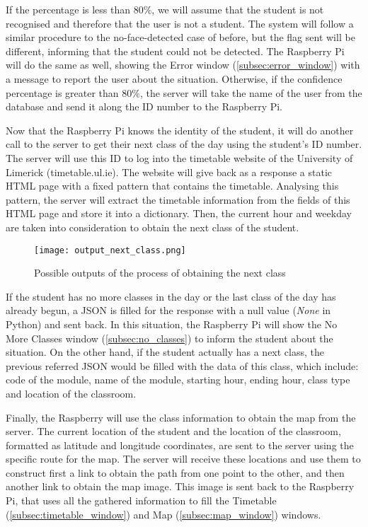 	If the percentage is less than 80\%, we will assume that the student is not recognised and therefore that the user is not a student. The system will follow a similar procedure to the no-face-detected case of before, but the flag sent will be different, informing that the student could not be detected. The Raspberry Pi will do the same as well, showing the Error window (\ref{subsec:error_window}) with a message to report the user about the situation. Otherwise, if the confidence percentage is greater than 80\%, the server will take the name of the user from the database and send it along the ID number to the Raspberry Pi.

	Now that the Raspberry Pi knows the identity of the student, it will do another call to the server to get their next class of the day using the student's ID number. The server will use this ID to log into the timetable website of the University of Limerick (timetable.ul.ie). The website will give back as a response a static HTML page with a fixed pattern that contains the timetable. Analysing this pattern, the server will extract the timetable information from the fields of this HTML page and store it into a dictionary. Then, the current hour and weekday are taken into consideration to obtain the next class of the student.   

	\begin{figure}[!ht]
		\centering
		\texttt{[image: output\_next\_class.png]}
		\caption{Possible outputs of the process of obtaining the next class}
		\label{fig:output_next_class}
	\end{figure}

	If the student has no more classes in the day or the last class of the day has already begun, a JSON is filled for the response with a null value (\textit{None} in Python) and sent back. In this situation, the Raspberry Pi will show the No More Classes window (\ref{subsec:no_classes}) to inform the student about the situation. On the other hand, if the student actually has a next class, the previous referred JSON would be filled with the data of this class, which include: code of the module, name of the module, starting hour, ending hour, class type and location of the classroom.

	Finally, the Raspberry will use the class information to obtain the map from the server. The current location of the student and the location of the classroom, formatted as latitude and longitude coordinates, are sent to the server using the specific route for the map. The server will receive these locations and use them to construct first a link to obtain the path from one point to the other, and then another link to obtain the map image. This image is sent back to the Raspberry Pi, that uses all the gathered information to fill the Timetable (\ref{subsec:timetable_window}) and Map (\ref{subsec:map_window}) windows.

